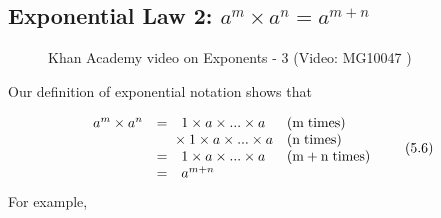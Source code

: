             \subsection{ Exponential Law 2: ${a}^{m}\ensuremath{\times}{a}^{n}={a}^{m+n}$}
            \nopagebreak
        \label{m38359*eip-427}
    \setcounter{subfigure}{0}
	\begin{figure}[H] %
    \textnormal{Khan Academy video on Exponents - 3}\vspace{.1in} \nopagebreak
  \label{m38359*yt-media3}\label{m38359*yt-video3}
             { (Video:  MG10047 )}
      \vspace{2pt}
    \vspace{.1in}
 \end{figure}       \par \label{m38359*id63888}Our definition of exponential notation shows that\par 
        \label{m38359*uid12}\nopagebreak\noindent{}
    \begin{equation}
    \begin{array}{cccc}\hfill {a}^{m}\ensuremath{\times}{a}^{n}& =& 1\ensuremath{\times}a\ensuremath{\times}...\ensuremath{\times}a\hfill & \left(\mathrm{m\; times}\right)\hfill \\ \hfill & & \phantom{\rule{-0.166667em}{0ex}}\phantom{\rule{-0.166667em}{0ex}}\phantom{\rule{-0.166667em}{0ex}}\phantom{\rule{-0.166667em}{0ex}}\ensuremath{\times}1\ensuremath{\times}a\ensuremath{\times}...\ensuremath{\times}a\hfill & \left(\mathrm{n\; times}\right)\hfill \\ \hfill & =& 1\ensuremath{\times}a\ensuremath{\times}...\ensuremath{\times}a\hfill & \left(\mathrm{m}+\mathrm{n\; times}\right)\hfill \\ \hfill & =& {a}^{m+n}\hfill & \end{array}\tag{5.6}
      \end{equation}
        \label{m38359*id64082}For example,\par 
        \label{m38359*id64085}\nopagebreak\noindent{}
          
